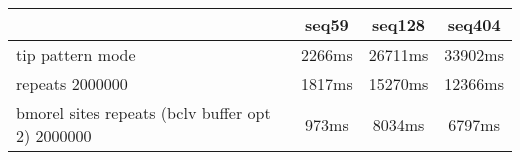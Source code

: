 \begin{tabular}{|l|c|c|c|}
\hline
 & seq59 & seq128 & seq404  \\
\hline
tip pattern mode &  2266ms &  26711ms &  33902ms\\
\hline
repeats 2000000 &  1817ms &  15270ms &  12366ms\\
\hline
bmorel sites repeats (bclv buffer opt 2) 2000000 &  973ms &  8034ms &  6797ms\\
\hline
\end{tabular}
